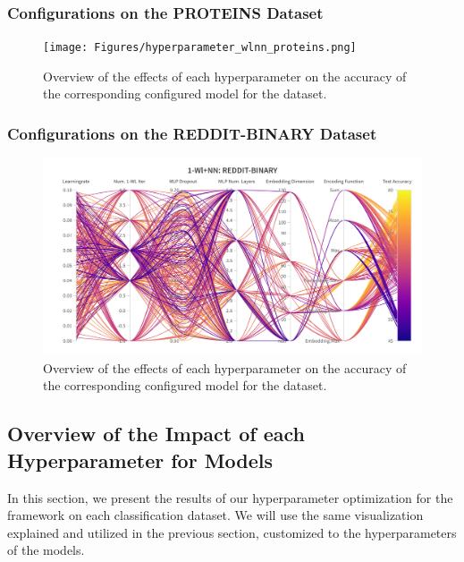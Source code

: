 \subsubsection{\wlnn Configurations on the PROTEINS Dataset}
\begin{figure}[H]
    \centering
    \texttt{[image: Figures/hyperparameter\_wlnn\_proteins.png]}
    \caption{Overview of the effects of each hyperparameter on the accuracy of the corresponding configured \wlnn model for the \proteins dataset.}
    \label{fig:wandb_wlnn_proteins}
\end{figure}

\subsubsection{\wlnn Configurations on the REDDIT-BINARY Dataset}
\begin{figure}[H]
    \centering
    \includegraphics[width=\textwidth, trim={0 75 0 150}, clip]{Figures/hyperparameter_wlnn_reddit.png}
    \caption{Overview of the effects of each hyperparameter on the accuracy of the corresponding configured \wlnn model for the \reddit dataset.}
    \label{fig:wandb_wlnn_reddit}
\end{figure}
\clearpage


\subsection{Overview of the Impact of each Hyperparameter for \gnn Models}
In this section, we present the results of our hyperparameter optimization for the \gnn framework on each classification dataset. We will use the same visualization explained and utilized in the previous section, customized to the hyperparameters of the \gnn models.

